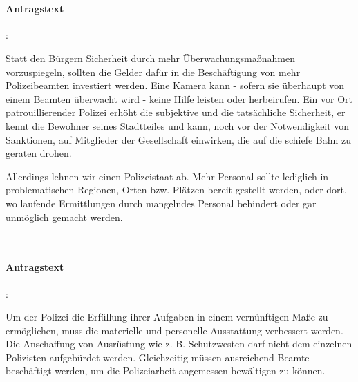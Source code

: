 

\\

\paragraph{Antragstext}:

Statt den Bürgern Sicherheit durch mehr Überwachungsmaßnahmen vorzuspiegeln, sollten die Gelder dafür in die Beschäftigung von mehr Polizeibeamten investiert werden. Eine Kamera kann - sofern sie überhaupt von einem Beamten überwacht wird - keine Hilfe leisten oder herbeirufen. Ein vor Ort patrouillierender Polizei erhöht die subjektive und die tatsächliche Sicherheit, er kennt die Bewohner {\Gu}seines{\Go} Stadtteiles und kann, noch vor der Notwendigkeit von Sanktionen, auf Mitglieder der Gesellschaft einwirken, die auf die schiefe Bahn zu geraten drohen.

Allerdings lehnen wir einen Polizeistaat ab. Mehr Personal sollte lediglich in problematischen Regionen, Orten bzw. Plätzen bereit gestellt werden, oder dort, wo laufende Ermittlungen durch mangelndes Personal behindert oder gar unmöglich gemacht werden.


\\

\paragraph{Antragstext}:

Um der Polizei die Erfüllung ihrer Aufgaben in einem vernünftigen Maße zu ermöglichen, muss die materielle und personelle Ausstattung verbessert werden. Die Anschaffung von Ausrüstung wie z. B. Schutzwesten darf nicht dem einzelnen Polizisten aufgebürdet werden. Gleichzeitig müssen ausreichend Beamte beschäftigt werden, um die Polizeiarbeit angemessen bewältigen zu können. 


